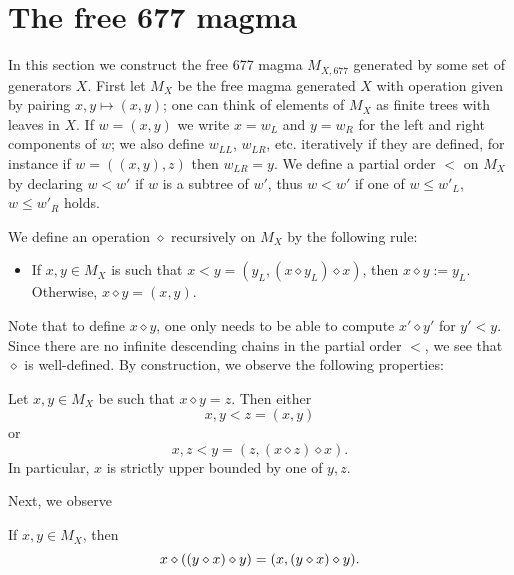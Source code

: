 \section{The free 677 magma}

In this section we construct the free 677 magma $M_{X,677}$ generated by some set of generators $X$.  First let $M_X$ be the free magma generated $X$ with operation given by pairing $x,y \mapsto (x,y)$; one can think of elements of $M_X$ as finite trees with leaves in $X$.  If $w = (x,y)$ we write $x = w_L$ and $y = w_R$ for the left and right components of $w$; we also define $w_{LL}$, $w_{LR}$, etc. iteratively if they are defined, for instance if $w = ((x,y),z)$ then $w_{LR} = y$.  We define a partial order $<$ on $M_X$ by declaring $w < w'$ if $w$ is a subtree of $w'$, thus $w < w'$ if one of $w \leq w'_L$, $w \leq w'_R$ holds.

We define an operation $\diamond$ recursively on $M_X$ by the following rule:
\begin{itemize}
\item If $x,y \in M_X$ is such that $x < y = (y_L, (x \diamond y_L) \diamond x)$, then $x \diamond y := y_L$.  Otherwise, $x \diamond y = (x,y)$.
\end{itemize}

Note that to define $x \diamond y$, one only needs to be able to compute $x' \diamond y'$ for $y' < y$.  Since there are no infinite descending chains in the partial order $<$, we see that $\diamond$ is well-defined.  By construction, we observe the following properties:

\begin{lemma}\label{op-prop}  Let $x,y \in M_X$ be such that $x \diamond y = z$.  Then either
$$ x, y < z = (x,y)$$
or
$$ x, z < y = (z, (x \diamond z) \diamond x).$$
In particular, $x$ is strictly upper bounded by one of $y,z$.
\end{lemma}

Next, we observe

\begin{lemma}\label{op-2-677}  If $x,y \in M_X$, then
  $$ x \diamond ((y \diamond x) \diamond y) = (x, (y \diamond x) \diamond y).$$
\end{lemma}

